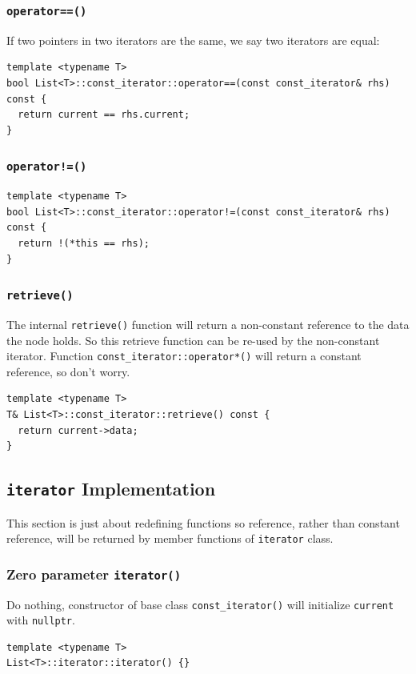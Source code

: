 \documentclass[11pt]{book}
\begin{document}
\subsubsection{\texttt{operator==()}}
\label{sec:org81e9b7f}
If two pointers in two iterators are the same, we say two iterators are equal:
\begin{verbatim}
template <typename T>
bool List<T>::const_iterator::operator==(const const_iterator& rhs) const {
  return current == rhs.current;
}
\end{verbatim}
\subsubsection{\texttt{operator!=()}}
\label{sec:org0c31d09}
\begin{verbatim}
template <typename T>
bool List<T>::const_iterator::operator!=(const const_iterator& rhs) const {
  return !(*this == rhs);
}
\end{verbatim}
\subsubsection{\texttt{retrieve()}}
\label{sec:orgdd4f220}
The internal \texttt{retrieve()} function will return a non-constant reference to the data the node holds. So this retrieve function can be re-used by the non-constant iterator. Function \texttt{const\_iterator::operator*()} will return a constant reference, so don't worry.
\begin{verbatim}
template <typename T>
T& List<T>::const_iterator::retrieve() const {
  return current->data;
}
\end{verbatim}
\subsection{\texttt{iterator} Implementation}
\label{sec:org7444eff}
This section is just about redefining functions so reference, rather than constant reference, will be returned by member functions of \texttt{iterator} class.
\subsubsection{Zero parameter \texttt{iterator()}}
\label{sec:org853c43c}
Do nothing, constructor of base class \texttt{const\_iterator()} will initialize \texttt{current} with \texttt{nullptr}.
\begin{verbatim}
template <typename T>
List<T>::iterator::iterator() {}
\end{verbatim}
\end{document}
